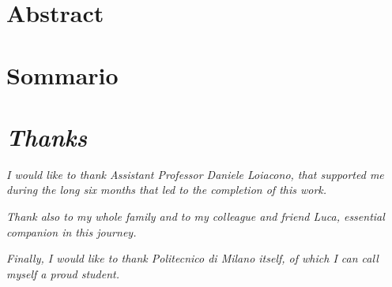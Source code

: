 \chapter{Abstract}



\chapter{Sommario}



\chapter{\textit{Thanks}}

\textit{I would like to thank Assistant Professor Daniele Loiacono, that supported me during the long six months that led to the completion of this work.}

\par \mbox{}

\textit{Thank also to my whole family and to my colleague and friend Luca, essential companion in this journey.}

\par \mbox{}

\textit{Finally, I would like to thank Politecnico di Milano itself, of which I can call myself a proud student.}

\par \mbox{}

\textit{}